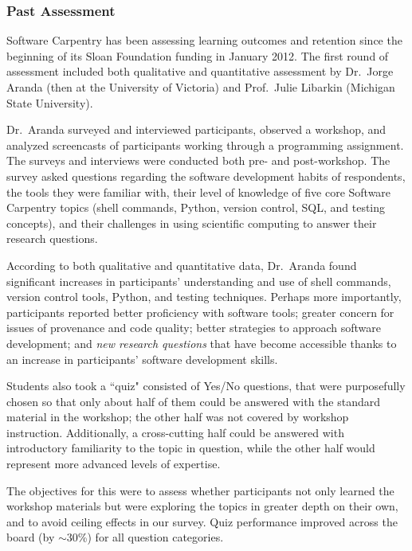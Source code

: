 \documentclass{proposalnsf}
\begin{document}
\subsubsection{Past Assessment}
\label{sec:pastAssessment}

Software Carpentry has been assessing learning outcomes and retention
since the beginning of its Sloan Foundation funding in January 2012.
The first round of assessment included both qualitative and
quantitative assessment by Dr.\ Jorge Aranda (then at the University
of Victoria) and Prof.\ Julie Libarkin (Michigan State University).

Dr.\ Aranda surveyed and interviewed participants, observed a
workshop, and analyzed screencasts of participants working through a
programming assignment. The surveys and interviews were conducted 
both pre- and post-workshop. The survey asked questions regarding
the software development habits of respondents, the tools they were familiar with, their level of knowledge of five core Software
Carpentry topics (shell commands, Python, version control, SQL, and 
testing concepts), and their challenges in using scientific computing
to answer their research questions. 

According to both qualitative and quantitative data,
Dr.\ Aranda found significant increases in
participants' understanding and use of shell commands, version control
tools, Python, and testing techniques. Perhaps more importantly,
participants reported better proficiency with software tools; greater
concern for issues of provenance and code quality; better strategies
to approach software development; and \emph{new research questions} that have
become accessible thanks to an increase in participants' software
development skills.

Students also took a ``quiz" consisted of Yes/No questions, that were purposefully chosen so that only about half of them could be answered with the standard material in the workshop; the other half was not covered by workshop instruction. Additionally, a cross-cutting half could be answered with introductory familiarity to the topic in question, while the other half would represent more advanced levels of expertise. %

The objectives for this were to assess whether participants not only learned the workshop materials but were exploring the topics in greater depth on their own, and to avoid ceiling effects in our survey. Quiz performance improved across the board (by $\sim$30\%) for all question categories.
\end{document}
